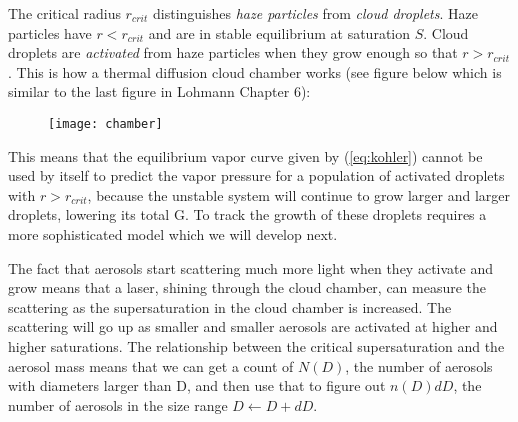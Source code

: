 \documentclass[12pt]{article}
\begin{document}
The critical radius $r_{crit}$ 
distinguishes \textit{haze particles} from \textit{cloud droplets}.
Haze particles have $r < r_{crit}$ and are in stable equilibrium at
saturation $S$. Cloud droplets are \textit{activated} from haze
particles when they grow enough so that $r > r_{crit}$.  This is how
a thermal diffusion cloud chamber works (see figure below which is similar to 
the last figure in Lohmann Chapter 6):

 \begin{figure}[htbp]
  \texttt{[image: chamber]}
 \end{figure}

This means that the equilibrium vapor curve given by (\ref{eq:kohler}) cannot
be used by itself to predict the vapor pressure for a population of
activated droplets with $r > r_{crit}$, because the unstable system will
continue to grow larger and larger droplets, lowering its total
G.  To track the growth of these droplets requires a more sophisticated
model which we will develop next.

The fact that aerosols start scattering much more light when they activate and grow
means that a laser, shining through the cloud chamber, can measure the scattering
as the supersaturation in the cloud chamber is increased.  The scattering will go up
as smaller and smaller aerosols are activated at higher and higher saturations.
The relationship between the critical supersaturation and the aerosol mass means
that we can get a count of $N(D)$, the number of aerosols with diameters larger than
D, and then use that to figure out $n(D)dD$, the number of aerosols in the size
range $D \leftarrow D + dD$.
\end{document}
